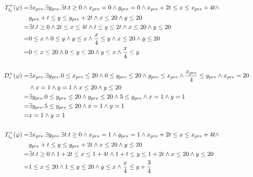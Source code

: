 
\begin{align*}
T_{l_0}^+(\varphi) = &\exists x_{pre}.\exists y_{pre}.\exists t. t\ge 0\wedge x_{pre}=0\wedge y_{pre}=0\wedge x_{pre} +2t\leq x\leq x_{pre} +4t\wedge\\&y_{pre} +t\leq y\leq y_{pre} + 2t\wedge x\leq 20\wedge y\leq 20\\
=&\exists t. t\ge 0\wedge 2t\leq x\leq 4t\wedge t\leq y\leq 2t\wedge x\leq 20\wedge y\leq 20\\
=&0\leq x\wedge 0\leq y\wedge y\leq x\wedge \frac{x}{4}\leq y\wedge x\leq 20\wedge y\leq 20\\
=&0\leq x\leq 20\wedge 0\leq y\leq 20\wedge y\leq x\wedge \frac{x}{4}\leq y\\\\
D_e^+(\varphi)=&\exists x_{pre}.\exists y_{pre}.0\leq x_{pre}\leq 20\wedge 0\leq y_{pre}\leq 20\wedge y_{pre}\leq x_{pre}\wedge \frac{x_{pre}}{4}\leq y_{pre}\wedge x_{pre}=20\\&\wedge x=1\wedge y=1\wedge x\leq 20\wedge y\leq 20\\
=&\exists y_{pre}.0\leq y_{pre}\leq 20\wedge y_{pre}\leq 20\wedge 5\leq y_{pre}\wedge x=1\wedge y=1\\
=&\exists y_{pre}.5\leq y_{pre}\leq 20\wedge x=1\wedge y=1\\
=&x=1\wedge y=1\\\\
T_{l_0}^+(\varphi) = &\exists x_{pre}.\exists y_{pre}.\exists t. t\ge 0\wedge x_{pre}=1\wedge y_{pre}=1\wedge x_{pre} +2t\leq x\leq x_{pre} +4t\wedge\\&y_{pre} +t\leq y\leq y_{pre} + 2t\wedge x\leq 20\wedge y\leq 20\\
=&\exists t. t\ge 0\wedge 1+2t\leq x\leq 1+4t\wedge 1+t\leq y\leq 1+2t\wedge x\leq 20\wedge y\leq 20\\
=& 1\leq x\leq 20\wedge 1\leq y\leq 20 \wedge y\leq x \wedge \frac{x}{4}\leq y +\frac{3}{4}
\end{align*}